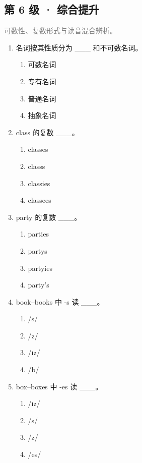 \documentclass[11pt,a4paper]{ctexart}
\begin{document}
\subsection*{第 6 级 · 综合提升}
\noindent\textcolor{gray}{可数性、复数形式与读音混合辨析。}\par\smallskip
\begin{enumerate}[leftmargin=*,itemsep=4pt]
\item 名词按其性质分为 \_\_\_ 和不可数名词。
\begin{enumerate}[label=\Alph*.,leftmargin=2em,itemsep=1pt,topsep=2pt]
\item 可数名词
\item 专有名词
\item 普通名词
\item 抽象名词
\end{enumerate}
\item class 的复数 \_\_\_。
\begin{enumerate}[label=\Alph*.,leftmargin=2em,itemsep=1pt,topsep=2pt]
\item classes
\item classs
\item classies
\item classees
\end{enumerate}
\item party 的复数 \_\_\_。
\begin{enumerate}[label=\Alph*.,leftmargin=2em,itemsep=1pt,topsep=2pt]
\item parties
\item partys
\item partyies
\item party’s
\end{enumerate}
\item book–books 中 -s 读 \_\_\_。
\begin{enumerate}[label=\Alph*.,leftmargin=2em,itemsep=1pt,topsep=2pt]
\item /s/
\item /z/
\item /ɪz/
\item /b/
\end{enumerate}
\item box–boxes 中 -es 读 \_\_\_。
\begin{enumerate}[label=\Alph*.,leftmargin=2em,itemsep=1pt,topsep=2pt]
\item /ɪz/
\item /s/
\item /z/
\item /es/
\end{enumerate}

\end{enumerate}
\end{document}
